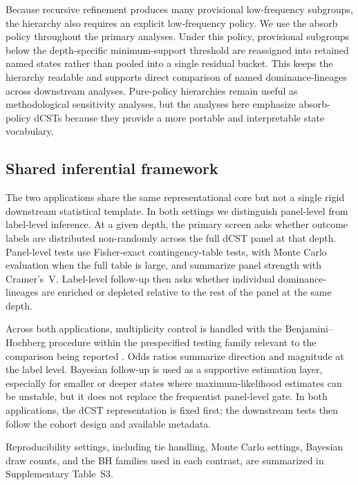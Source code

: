 \documentclass[11pt]{article}
\begin{document}
Because recursive refinement produces many provisional low-frequency subgroups,
the hierarchy also requires an explicit low-frequency policy. We use the absorb
policy throughout the primary analyses. Under this policy, provisional subgroups
below the depth-specific minimum-support threshold are reassigned into retained
named states rather than pooled into a single residual bucket.
This keeps the hierarchy readable and supports direct comparison of named
dominance-lineages across downstream analyses. Pure-policy hierarchies remain
useful as methodological sensitivity analyses, but the analyses here emphasize
absorb-policy dCSTs because they provide a more portable and interpretable
state vocabulary.

\subsection{Shared inferential framework}

The two applications share the same representational core but not a
single rigid downstream statistical template. In both settings we distinguish
panel-level from label-level inference. At a given depth, the primary screen
asks whether outcome labels are distributed non-randomly across the full dCST
panel at that depth. Panel-level tests use Fisher-exact contingency-table tests,
with Monte Carlo evaluation when the full table is large, and summarize panel
strength with Cramer's~V. Label-level follow-up then asks whether individual
dominance-lineages are enriched or depleted relative to the rest of the panel
at the same depth.

Across both applications, multiplicity control is handled with the
Benjamini--Hochberg procedure within the prespecified testing family relevant to
the comparison being reported \cite{BenjaminiHochberg1995}. Odds ratios summarize direction and magnitude at
the label level. Bayesian follow-up is used as a supportive estimation layer,
especially for smaller or deeper states where maximum-likelihood estimates can
be unstable, but it does not replace the frequentist panel-level gate. In both
applications, the dCST representation is fixed first; the downstream tests then
follow the cohort design and available metadata.

Reproducibility settings, including tie handling, Monte Carlo settings,
Bayesian draw counts, and the BH families used in each contrast, are summarized
in Supplementary Table~S3.
\end{document}
